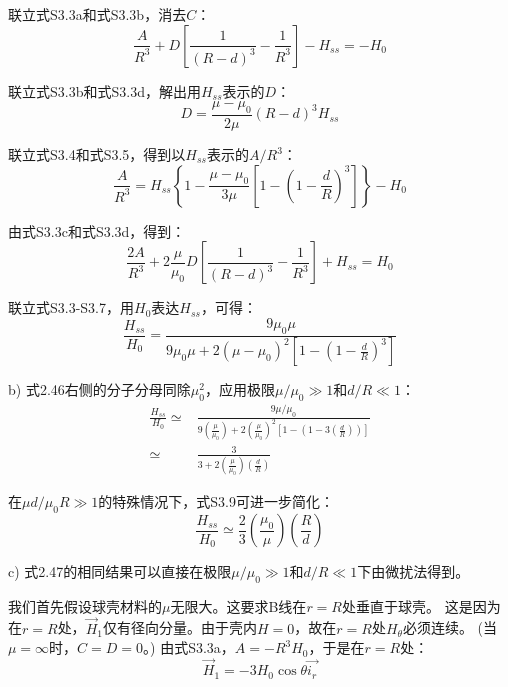 联立式S3.3a和式S3.3b，消去$C$：
\begin{equation*}
\frac{A}{R^3}+D\left[\frac{1}{(R-d)^3}-\frac{1}{R^3}\right]-H_{ss} =-H_0 \tag{S3.4}
\end{equation*}


联立式S3.3b和式S3.3d，解出用$H_{ss}$表示的$D$：
\begin{equation*}
D=\frac{\mu-\mu_0}{2\mu} \left(R-d\right)^3 H_{ss}  \tag{S3.5}
\end{equation*}

联立式S3.4和式S3.5，得到以$H_{ss}$表示的$A/R^3$：
\begin{equation*}
\frac{A}{R^3}=H_{ss}\left\{1-\frac{\mu-\mu_0}{3\mu}\left[1-\left(1-\frac{d}{R}\right)^3\right]\right\}-H_0   \tag{S3.6}
\end{equation*}

由式S3.3c和式S3.3d，得到：
\begin{equation*}
\frac{2A}{R^3}+2\frac{\mu}{\mu_0}D\left[\frac{1}{(R-d)^3}-\frac{1}{R^3}\right]+H_{ss} =H_0  \tag{S3.7}
\end{equation*}

联立式S3.3-S3.7，用$H_0$表达$H_{ss}$，可得：
\begin{equation*}
\frac{H_{ss}}{H_0}=\frac{9\mu_0 \mu}{9\mu_0 \mu+2(\mu-\mu_0)^2\left[1-\left(1-\frac{d}{R}\right)^3\right]}  \tag{2.46}
\end{equation*}

b) 式2.46右侧的分子分母同除$\mu_0^2$，应用极限$\mu/\mu_0\gg 1$和$d/R\ll 1$：
\begin{align}
\frac{H_{ss}}{H_0}\simeq& \frac{9\mu/\mu_0}{9\left(\frac{\mu}{\mu_0}\right)+2\left(\frac{\mu}{\mu_0}\right)^2\left[1-\left(1-3\left(\frac{d}{R}\right)\right)\right]} \nonumber\tag{S3.8}\\
\simeq&\frac{3}{3+2\left(\frac{\mu}{\mu_0}\right)\left(\frac{d}{R}\right)}\nonumber \tag{S3.9}
\end{align}

在$\mu d/\mu_0 R \gg 1$的特殊情况下，式S3.9可进一步简化：
\begin{equation*}
\frac{H_{ss}}{H_0}\simeq \frac{2}{3}\left(\frac{\mu_0}{\mu}\right)\left(\frac{R}{d}\right)  \tag{2.47}
\end{equation*}

c) 式2.47的相同结果可以直接在极限$\mu/\mu_0\gg 1$和$d/R\ll 1$下由微扰法得到。

我们首先假设球壳材料的$\mu$无限大。这要求B线在$r=R$处垂直于球壳。
这是因为在$r=R$处，$\vec{H}_1$仅有径向分量。由于壳内$H=0$，故在$r=R$处$H_\theta$必须连续。
(当$\mu=\infty$时，$C=D=0$。)
由式S3.3a，$A=-R^3 H_0$，于是在$r=R$处：
\begin{equation*}
\vec{H}_1=-3 H_0 \cos\theta \vec{i_r} \tag{S3.10}
\end{equation*}

